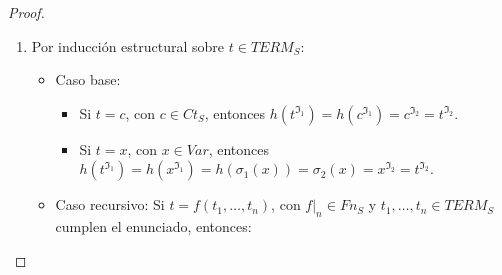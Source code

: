 \begin{proof} \mbox{}
\begin{enumerate}
    \item Por inducción estructural sobre $t \in TERM_S$:
        \begin{itemize}
            \item Caso base:
                \begin{itemize}
                \item Si $t = c$, con $c \in Ct_S$, entonces $h(t^{\mathfrak{I}_1}) = h(c^{\mathfrak{I}_1}) = c^{\mathfrak{I}_2} = t^{\mathfrak{I}_2}$.
                \item Si $t = x$, con $x \in Var$, entonces $h(t^{\mathfrak{I}_1}) = h(x^{\mathfrak{I}_1}) = h(\sigma_1(x)) = \sigma_2(x) = x^{\mathfrak{I}_2} = t^{\mathfrak{I}_2}$.
                 \end{itemize}
            \item Caso recursivo: Si $t = f(t_1, \dots, t_n)$, con $f|_n \in Fn_S$ y $t_1, \dots, t_n \in TERM_S$ cumplen el enunciado, entonces: 
            

\end{itemize}
\end{enumerate}
\end{proof}
